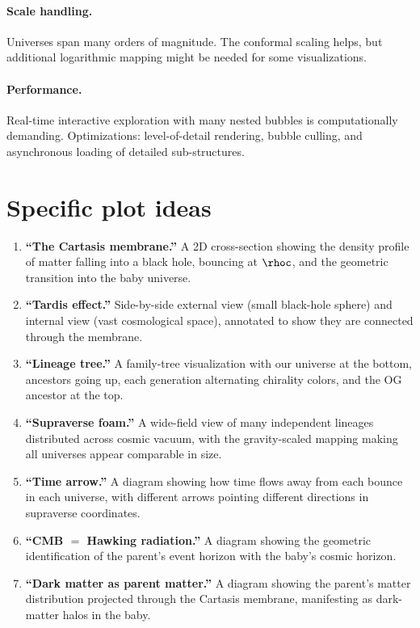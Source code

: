 \paragraph{Scale handling.} Universes span many orders of magnitude. The
conformal scaling helps, but additional logarithmic mapping might be needed for
some visualizations.

\paragraph{Performance.} Real-time interactive exploration with many nested
bubbles is computationally demanding. Optimizations: level-of-detail rendering,
bubble culling, and asynchronous loading of detailed sub-structures.

\section{Specific plot ideas}

\begin{enumerate}
  \item \textbf{``The Cartasis membrane.''} A 2D cross-section showing the
    density profile of matter falling into a black hole, bouncing at $\rhoc$, and
    the geometric transition into the baby universe.
  \item \textbf{``Tardis effect.''} Side-by-side external view (small black-hole
    sphere) and internal view (vast cosmological space), annotated to show they
    are connected through the membrane.
  \item \textbf{``Lineage tree.''} A family-tree visualization with our universe
    at the bottom, ancestors going up, each generation alternating chirality
    colors, and the OG ancestor at the top.
  \item \textbf{``Supraverse foam.''} A wide-field view of many independent
    lineages distributed across cosmic vacuum, with the gravity-scaled mapping
    making all universes appear comparable in size.
  \item \textbf{``Time arrow.''} A diagram showing how time flows away from each
    bounce in each universe, with different arrows pointing different directions
    in supraverse coordinates.
  \item \textbf{``CMB $=$ Hawking radiation.''} A diagram showing the geometric
    identification of the parent's event horizon with the baby's cosmic horizon.
  \item \textbf{``Dark matter as parent matter.''} A diagram showing the parent's
    matter distribution projected through the Cartasis membrane, manifesting as
    dark-matter halos in the baby.
\end{enumerate}

